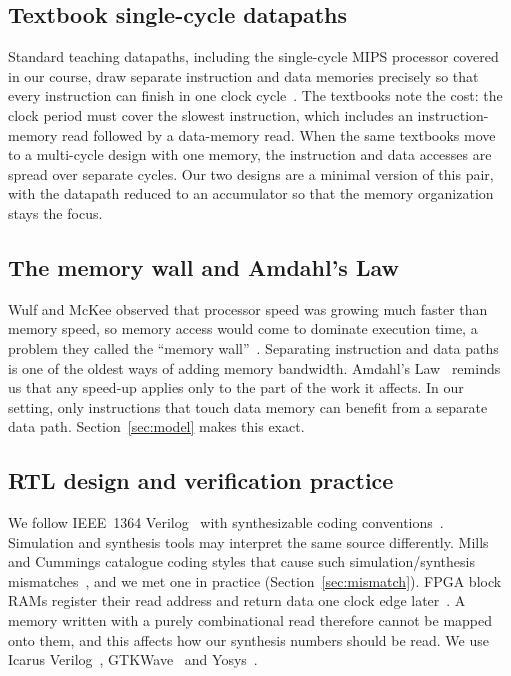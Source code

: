\documentclass[conference]{IEEEtran}
\begin{document}
\subsection{Textbook single-cycle datapaths}
Standard teaching datapaths, including the single-cycle MIPS processor covered in our course, draw separate instruction and data memories precisely so that every instruction can finish in one clock cycle~\cite{patterson,harris}. The textbooks note the cost: the clock period must cover the slowest instruction, which includes an instruction-memory read followed by a data-memory read. When the same textbooks move to a multi-cycle design with one memory, the instruction and data accesses are spread over separate cycles. Our two designs are a minimal version of this pair, with the datapath reduced to an accumulator so that the memory organization stays the focus.

\subsection{The memory wall and Amdahl's Law}
Wulf and McKee observed that processor speed was growing much faster than memory speed, so memory access would come to dominate execution time, a problem they called the ``memory wall''~\cite{wulf}. Separating instruction and data paths is one of the oldest ways of adding memory bandwidth. Amdahl's Law~\cite{amdahl} reminds us that any speed-up applies only to the part of the work it affects. In our setting, only instructions that touch data memory can benefit from a separate data path. Section~\ref{sec:model} makes this exact.

\subsection{RTL design and verification practice}
We follow IEEE~1364 Verilog~\cite{ieee1364} with synthesizable coding conventions~\cite{palnitkar}. Simulation and synthesis tools may interpret the same source differently. Mills and Cummings catalogue coding styles that cause such simulation/synthesis mismatches~\cite{mills}, and we met one in practice (Section~\ref{sec:mismatch}). FPGA block RAMs register their read address and return data one clock edge later~\cite{ug473}. A memory written with a purely combinational read therefore cannot be mapped onto them, and this affects how our synthesis numbers should be read. We use Icarus Verilog~\cite{icarus}, GTKWave~\cite{gtkwave} and Yosys~\cite{yosys}.
\end{document}
